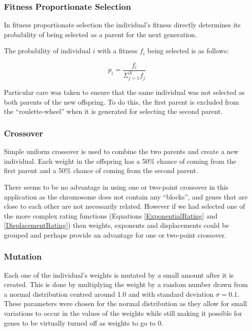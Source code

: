 \documentclass[a4paper,12pt]{article}
\begin{document}
\subsubsection{Fitness Proportionate Selection}

In fitness proportionate selection the individual's fitness directly determines
its probability of being selected as a parent for the next generation.

The probability of individual $i$ with a fitness $f_i$ being selected is as
follows:

\begin{equation}
  p_i = \frac{f_i}{\Sigma^N_{j=1} f_j}
\end{equation}

Particular care was taken to ensure that the same individual was not selected
as both parents of the new offspring.
To do this, the first parent is excluded from the ``roulette-wheel'' when it is
generated for selecting the second parent.

\subsubsection{Crossover}

Simple uniform crossover is used to combine the two parents and create a new
individual.
Each weight in the offspring has a 50\% chance of coming from the first parent
and a 50\% chance of coming from the second parent.

There seems to be no advantage in using one or two-point crossover in this
application as the chromosome does not contain any ``blocks'', and genes that
are close to each other are not necessarily related.
However if we had selected one of the more complex rating functions (Equations
\ref{ExponentialRating} and \ref{DisplacementRating}) then weights, exponents
and displacements could be grouped and perhaps provide an advantage for one or
two-point crossover.

\subsubsection{Mutation}

Each one of the individual's weights is mutated by a small amount after it is
created.
This is done by multiplying the weight by a random number drawn from a normal
distribution centred around 1.0 and with standard deviation $\sigma = 0.1$.
These parameters were chosen for the normal distribution as they allow for small
variations to occur in the values of the weights while still making it possible
for genes to be virtually turned off as weights to go to 0.
\end{document}
